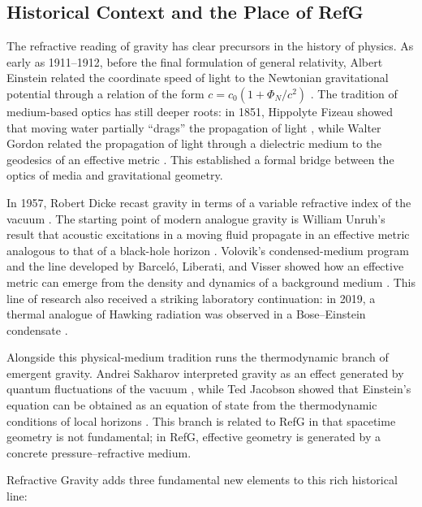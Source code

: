 \documentclass[11pt,a4paper]{article}
\begin{document}
\subsection{Historical Context and the Place of RefG}

The refractive reading of gravity has clear precursors in the history of physics. As early as 1911--1912, before the final formulation of general relativity, Albert Einstein related the coordinate speed of light to the Newtonian gravitational potential through a relation of the form $c=c_0(1+\Phi_N/c^2)$ \citep{einstein1911,einstein1912}. The tradition of medium-based optics has still deeper roots: in 1851, Hippolyte Fizeau showed that moving water partially ``drags'' the propagation of light \citep{fizeau1851}, while Walter Gordon related the propagation of light through a dielectric medium to the geodesics of an effective metric \citep{gordon1923}. This established a formal bridge between the optics of media and gravitational geometry.

In 1957, Robert Dicke recast gravity in terms of a variable refractive index of the vacuum \citep{dicke1957}. The starting point of modern analogue gravity is William Unruh's result that acoustic excitations in a moving fluid propagate in an effective metric analogous to that of a black-hole horizon \citep{unruh1981}. Volovik's condensed-medium program and the line developed by Barceló, Liberati, and Visser showed how an effective metric can emerge from the density and dynamics of a background medium \citep{barcelo2011}. This line of research also received a striking laboratory continuation: in 2019, a thermal analogue of Hawking radiation was observed in a Bose--Einstein condensate \citep{munozdenova2019}.

Alongside this physical-medium tradition runs the thermodynamic branch of emergent gravity. Andrei Sakharov interpreted gravity as an effect generated by quantum fluctuations of the vacuum \citep{sakharov1967}, while Ted Jacobson showed that Einstein's equation can be obtained as an equation of state from the thermodynamic conditions of local horizons \citep{jacobson1995}. This branch is related to RefG in that spacetime geometry is not fundamental; in RefG, effective geometry is generated by a concrete pressure--refractive medium.

Refractive Gravity adds three fundamental new elements to this rich historical line:
\end{document}
